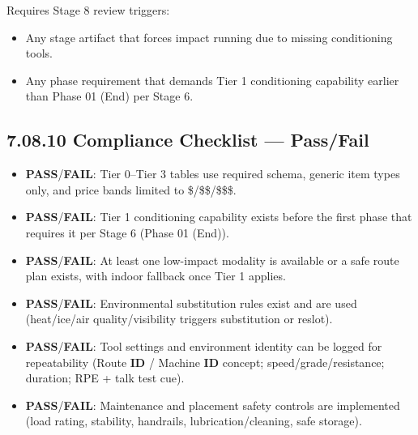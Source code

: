 \documentclass[10pt]{article}
\begin{document}
Requires Stage 8 review triggers:

\begin{itemize}
\item Any stage artifact that forces impact running due to missing conditioning tools.
\item Any phase requirement that demands Tier 1 conditioning capability earlier than Phase 01 (End) per Stage 6.
\end{itemize}

\subsection*{7.08.10 Compliance Checklist — Pass/Fail}
{}

\begin{itemize}
\item \textbf{PASS}/\textbf{FAIL}: Tier 0–Tier 3 tables use required schema, generic item types only, and price bands limited to \$/\$\$/\$\$\$.
\item \textbf{PASS}/\textbf{FAIL}: Tier 1 conditioning capability exists before the first phase that requires it per Stage 6 (Phase 01 (End)).
\item \textbf{PASS}/\textbf{FAIL}: At least one low-impact modality is available or a safe route plan exists, with indoor fallback once Tier 1 applies.
\item \textbf{PASS}/\textbf{FAIL}: Environmental substitution rules exist and are used (heat/ice/air quality/visibility triggers substitution or reslot).
\item \textbf{PASS}/\textbf{FAIL}: Tool settings and environment identity can be logged for repeatability (Route \textbf{ID} / Machine \textbf{ID} concept; speed/grade/resistance; duration; RPE + talk test cue).
\item \textbf{PASS}/\textbf{FAIL}: Maintenance and placement safety controls are implemented (load rating, stability, handrails, lubrication/cleaning, safe storage).
\end{itemize}
\end{document}
